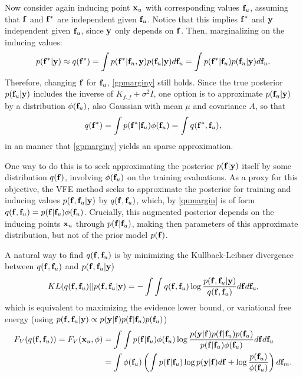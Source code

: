 Now consider again inducing point ${\mathbf x}_u$ with corresponding values ${\mathbf f}_u$, assuming that ${\mathbf f}$ and ${\mathbf f}^*$ are independent given ${\mathbf f}_u$. Notice that this implies ${\mathbf f}^*$ and ${\mathbf y}$ independent given ${\mathbf f}_u$, since ${\mathbf y}$ only depends on ${\mathbf f}$. Then, marginalizing on the inducing values:
\begin{equation}
p({\mathbf f}^*|{\mathbf y}) \approx q({\mathbf f}^*) =  \int p({\mathbf f}^*|{\mathbf f}_u,{\mathbf y}) p({\mathbf f}_u|{\mathbf y}) d{\mathbf f}_u = \int p({\mathbf f}^*|{\mathbf f}_u) p({\mathbf f}_u|{\mathbf y}) d{\mathbf f}_u.
\end{equation}
Therefore, changing ${\mathbf f}$ for ${\mathbf f}_u$, \eqref{gpmarginy} still holds. Since the true posterior $p({\mathbf f}_u|{\mathbf y})$ includes the inverse of $K_{f,f} + \sigma^2 I$, one option is to approximate $p({\mathbf f}_u|{\mathbf y})$ by a distribution $\phi({\mathbf f}_u)$, also Gaussian with mean $\mu$ and covariance $A$, so that 
\begin{equation} \label{qumargin}
q({\mathbf f}^*) = \int p({\mathbf f}^*|{\mathbf f}_u) \phi({\mathbf f}_u) = \int q({\mathbf f}^*,{\mathbf f}_u),
\end{equation} 
in an manner that \eqref{gpmarginy} yields an sparse approximation.

One way to do this is to seek approximating the posterior $p({\mathbf f}|{\mathbf y})$ itself by some distribution $q({\mathbf f})$, involving $\phi({\mathbf f}_u)$ on the training evaluations. As a proxy for this objective, the VFE method seeks to approximate the posterior for training and inducing values $p({\mathbf f},{\mathbf f}_u|{\mathbf y})$ by $q({\mathbf f},{\mathbf f}_u)$, which, by \eqref{qumargin} is of form $q({\mathbf f},{\mathbf f}_u) = p({\mathbf f}|{\mathbf f}_u) \phi({\mathbf f}_u)$. Crucially, this augmented posterior depends on the inducing points ${\mathbf x}_u$ through $p({\mathbf f}|{\mathbf f}_u)$, making then parameters of this approximate distribution, but not of the prior model $p({\mathbf f})$.

A natural way to find $q({\mathbf f},{\mathbf f}_u)$ is by minimizing the Kullback-Leibner divergence between $q({\mathbf f},{\mathbf f}_u)$ and $p({\mathbf f},{\mathbf f}_u|{\mathbf y})$ 
\begin{displaymath}
KL(q({\mathbf f},{\mathbf f}_u)||p({\mathbf f},{\mathbf f}_u|{\mathbf y}) = - \int \int q({\mathbf f},{\mathbf f}_u) \log \frac{p({\mathbf f},{\mathbf f}_u|{\mathbf y})}{q({\mathbf f},{\mathbf f}_u)} d{\mathbf f} d{\mathbf f}_u,
\end{displaymath}
which is equivalent to maximizing the evidence lower bound, or variational free energy (using $p({\mathbf f},{\mathbf f}_u|{\mathbf y}) \propto p({\mathbf y}|{\mathbf f}) p({\mathbf f}|{\mathbf f}_u) p({\mathbf f}_u)$)
\begin{equation}
\begin{split}
F_V(q({\mathbf f},{\mathbf f}_u)) = F_V({\mathbf x}_u,\phi) & = \int \int p({\mathbf f}|{\mathbf f}_u) \phi({\mathbf f}_u) \log \frac{p({\mathbf y}|{\mathbf f}) p({\mathbf f}|{\mathbf f}_u) p({\mathbf f}_u)}{p({\mathbf f}|{\mathbf f}_u) \phi({\mathbf f}_u)} d {\mathbf f} d {\mathbf f}_u \\
& = \int \phi({\mathbf f}_u) \left( \int p({\mathbf f}|{\mathbf f}_u) \log p({\mathbf y}|{\mathbf f}) d {\mathbf f} + \log \frac{p({\mathbf f}_u)}{\phi({\mathbf f}_u)} \right) d{\mathbf f}_m.
\end{split}
\end{equation}

